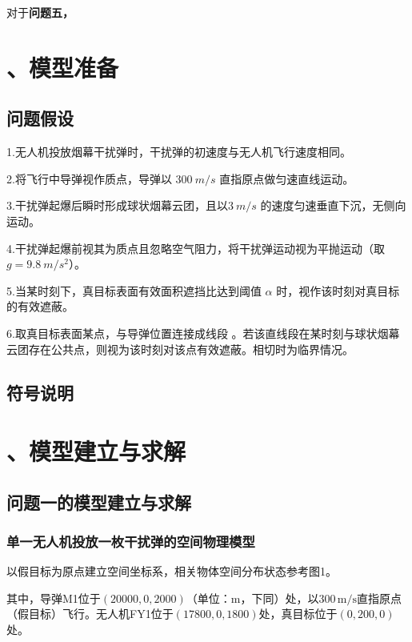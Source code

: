 \documentclass[12pt]{article}
\begin{document}
\begin{CJK}{UTF8}{gbsn}
		对于\textbf{问题五，}
		
		
		\section{、模型准备}
		
		\subsection{问题假设}
		
		1.无人机投放烟幕干扰弹时，干扰弹的初速度与无人机飞行速度相同。
		
		2.将飞行中导弹视作质点，导弹以 \(\SI{300}{m/s}\) 直指原点做匀速直线运动。
		
		3.干扰弹起爆后瞬时形成球状烟幕云团，且以\(\SI{3}{m/s}\) 的速度匀速垂直下沉，无侧向运动。
		
		4.干扰弹起爆前视其为质点且忽略空气阻力，将干扰弹运动视为平抛运动（取\(g = \SI{9.8}{m/s^2}\)）。
		
		5.当某时刻下，真目标表面有效面积遮挡比达到阈值 \(\alpha\) 时，视作该时刻对真目标的有效遮蔽。
		
		6.取真目标表面某点，与导弹位置连接成线段 。若该直线段在某时刻与球状烟幕云团存在公共点，则视为该时刻对该点有效遮蔽。相切时为临界情况。
		
		
		
		
		
		\subsection{符号说明}
		
		
		\section{、模型建立与求解}
		
		\subsection{问题一的模型建立与求解}
		
		\subsubsection{单一无人机投放一枚干扰弹的空间物理模型}
		
		以假目标为原点建立空间坐标系，相关物体空间分布状态参考图1。
		
		其中，导弹M1位于$(20000,0,2000)$（单位：m，下同）处，以$300\,\mathrm{m/s}$直指原点（假目标）飞行。无人机FY1位于$(17800,0,1800)$处，真目标位于$(0,200,0)$处。
		

\end{CJK}
\end{document}
